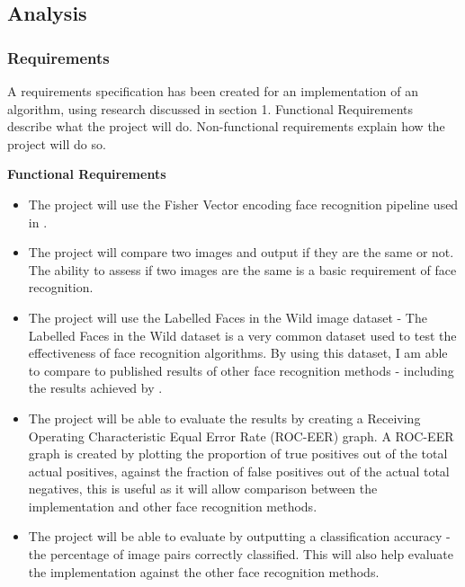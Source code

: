 \documentclass[12pt, a4paper]{article}
\begin{document}
\subsection{Analysis}
\subsubsection{Requirements}
A requirements specification has been created for an implementation of an algorithm, using research discussed in section 1. Functional Requirements describe what the project will do. Non-functional requirements explain how the project will do so.

\textbf{Functional Requirements}
\begin{itemize}
\item The project will use the Fisher Vector encoding face recognition pipeline used in \cite{simonyan2004fisher}.
\item The project will compare two images and output if they are the same or not. The ability to assess if two images are the same is a basic requirement of face recognition.
\item The project will use the Labelled Faces in the Wild image dataset - The Labelled Faces in the Wild dataset is a very common dataset used to test the effectiveness of face recognition algorithms. By using this dataset, I am able to compare to published results of other face recognition methods - including the results achieved by \cite{simonyan2004fisher}.
\item The project will be able to evaluate the results by creating a Receiving Operating Characteristic Equal Error Rate (ROC-EER) graph. A ROC-EER graph is created by plotting the proportion of true positives out of the total actual positives, against the fraction of false positives out of the actual total negatives, this is useful as it will allow comparison between the implementation and other face recognition methods.
\item The project will be able to evaluate by outputting a classification accuracy - the percentage of image pairs correctly classified. This will also help evaluate the implementation against the other face recognition methods.
\end{itemize}
\end{document}
